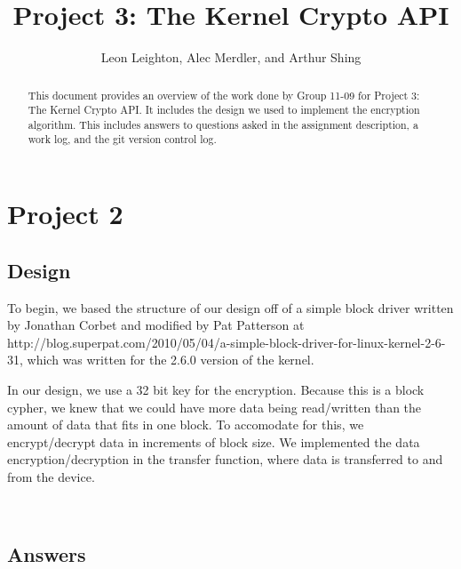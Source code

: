 \documentclass[journal, letterpaper, draftclsnofoot, onecolumn, 10pt]{IEEEtran}
\begin{document}
\title{Project 3: The Kernel Crypto API}
\author{Leon Leighton, Alec Merdler, and Arthur Shing}

\begin{titlepage}
    \centering
    \maketitle
    \begin{abstract}
      This document provides an overview of the work done by Group 11-09 for Project 3: The Kernel Crypto API.
      It includes the design we used to implement the encryption algorithm.
      This includes answers to questions asked in the assignment description, a work log, and the git version control log.
    \end{abstract}


\end{titlepage}
\tableofcontents
\clearpage

\section{Project 2}

\subsection{Design}
To begin, we based the structure of our design off of a simple block driver written by Jonathan Corbet and modified by Pat Patterson at http://blog.superpat.com/2010/05/04/a-simple-block-driver-for-linux-kernel-2-6-31, which was written for the 2.6.0 version of the kernel.

In our design, we use a 32 bit key for the encryption. Because this is a block cypher, we knew that we could have more data being read/written
than the amount of data that fits in one block. To accomodate for this, we encrypt/decrypt data in increments of block size.
We implemented the data encryption/decryption in the transfer function, where data is transferred to and from the device. 

 \\



\subsection{Answers}

\end{document}
